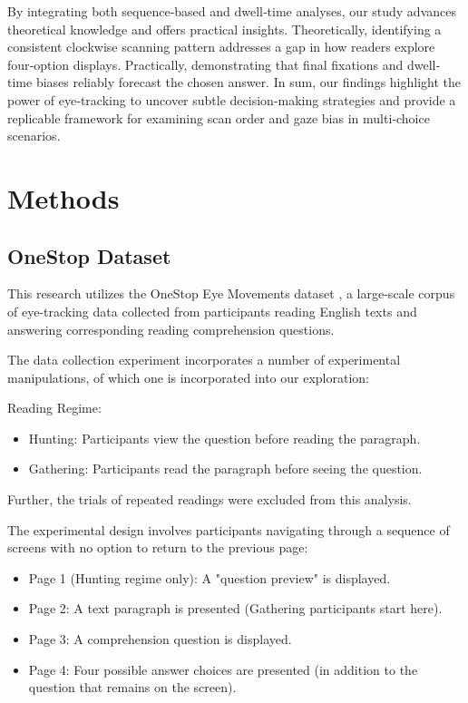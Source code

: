 \documentclass[manuscript,review,anonymous]{acmart}
\begin{document}
    By integrating both sequence‐based and dwell‐time analyses, our study advances theoretical knowledge and offers practical insights. Theoretically, identifying a consistent clockwise scanning pattern addresses a gap in how readers explore four‐option displays. Practically, demonstrating that final fixations and dwell‐time biases reliably forecast the chosen answer. In sum, our findings highlight the power of eye‐tracking to uncover subtle decision‐making strategies and provide a replicable framework for examining scan order and gaze bias in multi‐choice scenarios.



\section{Methods}
    \subsection{OneStop Dataset}
    This research utilizes the OneStop Eye Movements dataset  \citet{berzak2025onestop}, a large-scale corpus of eye-tracking data collected from participants reading English texts and answering corresponding reading comprehension questions.

    The data collection experiment incorporates a number of experimental manipulations, of which one is incorporated into our exploration:

    Reading Regime:
    \begin{itemize}
        \item Hunting: Participants view the question before reading the paragraph.
        \item Gathering: Participants read the paragraph before seeing the question.
    \end{itemize}

    Further, the trials of repeated readings were excluded from this analysis.
    \newline
    
    The experimental design involves participants navigating through a sequence of screens with no option to return to the previous page:
    \begin{itemize}
        \item Page 1 (Hunting regime only): A "question preview" is displayed.
        \item Page 2: A text paragraph is presented (Gathering participants start here).
        \item Page 3: A comprehension question is displayed.
        \item Page 4: Four possible answer choices are presented (in addition to the question that remains on the screen).
    \end{itemize}
\end{document}
